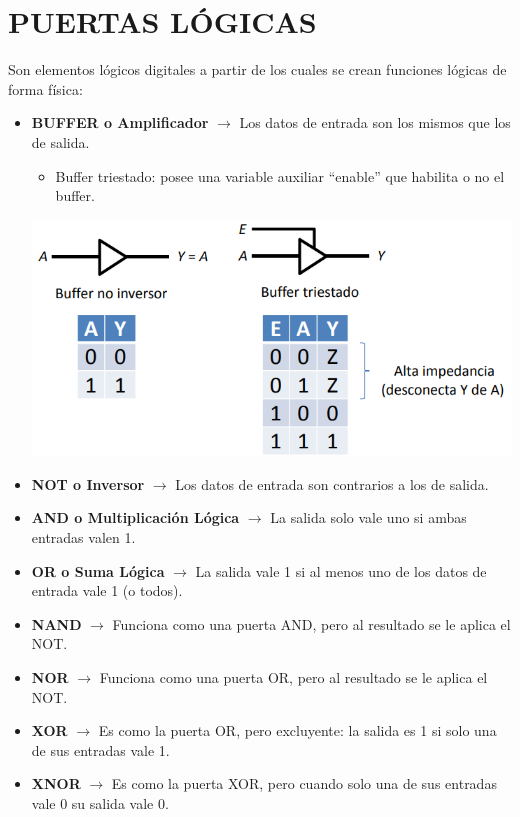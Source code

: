 \documentclass[a4paper,10pt]{book}
\begin{document}
\section*{PUERTAS LÓGICAS}
Son elementos lógicos digitales a partir de los cuales se crean funciones lógicas de forma física:
\begin{itemize}
\item \textbf{BUFFER o Amplificador} $\rightarrow$ Los datos de entrada son los mismos que los de salida.
	\begin{itemize}
	\item Buffer triestado: posee una variable auxiliar ``enable'' que habilita o no el buffer.
	\end{itemize}
	
\begin{center}
\includegraphics[scale=0.45]{buffer triestado}
\end{center}	
	
\item \textbf{NOT o Inversor} $\rightarrow$ Los datos de entrada son contrarios a los de salida.
\item \textbf{AND o Multiplicación Lógica} $\rightarrow$ La salida solo vale uno si ambas entradas valen 1.
\item \textbf{OR o Suma Lógica} $\rightarrow$ La salida vale 1 si al menos uno de los datos de entrada vale 1 (o todos).
\item \textbf{NAND} $\rightarrow$ Funciona como una puerta AND, pero al resultado se le aplica el NOT.
\item \textbf{NOR} $\rightarrow$ Funciona como una puerta OR, pero al resultado se le aplica el NOT.
\item \textbf{XOR} $\rightarrow$ Es como la puerta OR, pero excluyente: la salida es 1 si solo una de sus entradas vale 1.
\item \textbf{XNOR} $\rightarrow$ Es como la puerta XOR, pero cuando solo una de sus entradas vale 0 su salida vale 0.
\end{itemize}
\end{document}
